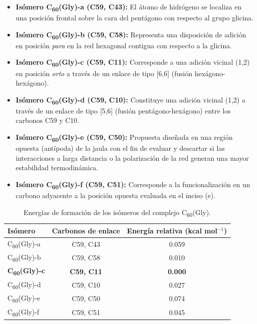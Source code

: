 \begin{itemize}
    \item \textbf{Isómero C\textsubscript{60}(Gly)-a (C59, C43):} El átomo de hidrógeno se localiza en una posición frontal sobre la cara del pentágono con respecto al grupo glicina.
    \item \textbf{Isómero C\textsubscript{60}(Gly)-b (C59, C58):} Representa una disposición de adición en posición \textit{para} en la red hexagonal contigua con respecto a la glicina.
    \item \textbf{Isómero C\textsubscript{60}(Gly)-c (C59, C11):} Corresponde a una adición vicinal (1,2) en posición \textit{orto} a través de un enlace de tipo [6,6] (fusión hexágono-hexágono).
    \item \textbf{Isómero C\textsubscript{60}(Gly)-d (C59, C10):} Constituye una adición vicinal (1,2) a través de un enlace de tipo [5,6] (fusión pentágono-hexágono) entre los carbonos C59 y C10.
    \item \textbf{Isómero C\textsubscript{60}(Gly)-e (C59, C50):} Propuesta diseñada en una región opuesta (antípoda) de la jaula con el fin de evaluar y descartar si las interacciones a larga distancia o la polarización de la red generan una mayor estabilidad termodinámica.
    \item \textbf{Isómero C\textsubscript{60}(Gly)-f (C59, C51):} Corresponde a la funcionalización en un carbono adyacente a la posición opuesta evaluada en el inciso (e).
\end{itemize}

\begin{table}[H]
    \centering
    \caption{Energías de formación de los isómeros del complejo C\textsubscript{60}(Gly).}
    \label{tab:isomeros-gly1}
    \renewcommand{\arraystretch}{1.15}
    \begin{tabular}{lcc}
        \toprule
        \textbf{Isómero} & \textbf{Carbonos de enlace} & \textbf{Energía relativa (kcal mol$^{-1}$)} \\
        \midrule
      C\textsubscript{60}(Gly)-a & C59, C43 & 0.059 \\
      C\textsubscript{60}(Gly)-b & C59, C58 & 0.010 \\
       \textbf{  C\textsubscript{60}(Gly)-c} &\textbf{ C59, C11} & \textbf{0.000} \\
         C\textsubscript{60}(Gly)-d & C59, C10 & 0.027 \\
        C\textsubscript{60}(Gly)-e & C59, C50 & 0.074 \\
         C\textsubscript{60}(Gly)-f & C59, C51 & 0.045 \\
        \bottomrule
    \end{tabular}
\end{table}

